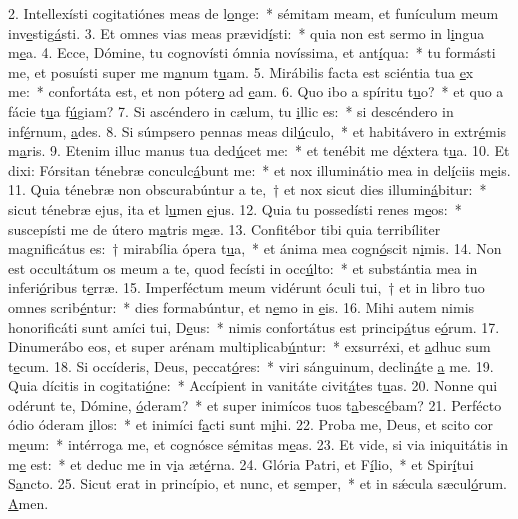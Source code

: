 2. Intellexísti cogitatiónes meas de l\uline{o}nge:~* sémitam meam, et funículum meum inv\uline{e}stig\uline{á}sti.
3. Et omnes vias meas prævid\uline{í}sti:~* quia non est sermo in l\uline{i}ngua m\uline{e}a.
4. Ecce, Dómine, tu cognovísti ómnia novíssima, et ant\uline{í}qua:~* tu formásti me, et posuísti super me m\uline{a}num t\uline{u}am.
5. Mirábilis facta est sciéntia tua \uline{e}x me:~* confortáta est, et non póter\uline{o} ad \uline{e}am.
6. Quo ibo a spíritu t\uline{u}o?~* et quo a fácie t\uline{u}a f\uline{ú}giam?
7. Si ascéndero in cælum, tu \uline{i}llic es:~* si descéndero in inf\uline{é}rnum, \uline{a}des.
8. Si súmpsero pennas meas dil\uline{ú}culo,~* et habitávero in extr\uline{é}mis m\uline{a}ris.
9. Etenim illuc manus tua ded\uline{ú}cet me:~* et tenébit me d\uline{é}xtera t\uline{u}a.
10. Et dixi: Fórsitan ténebræ conculc\uline{á}bunt me:~* et nox illuminátio mea in del\uline{í}ciis m\uline{e}is.
11. Quia ténebræ non obscurabúntur a te,~† et nox sicut dies illumin\uline{á}bitur:~* sicut ténebræ ejus, ita et l\uline{u}men \uline{e}jus.
12. Quia tu possedísti renes m\uline{e}os:~* suscepísti me de útero m\uline{a}tris m\uline{e}æ.
13. Confitébor tibi quia terribíliter magnificátus es:~† mirabília ópera t\uline{u}a,~* et ánima mea cogn\uline{ó}scit n\uline{i}mis.
14. Non est occultátum os meum a te, quod fecísti in occ\uline{ú}lto:~* et substántia mea in inferi\uline{ó}ribus t\uline{e}rræ.
15. Imperféctum meum vidérunt óculi tui,~† et in libro tuo omnes scrib\uline{é}ntur:~* dies formabúntur, et n\uline{e}mo in \uline{e}is.
16. Mihi autem nimis honorificáti sunt amíci tui, D\uline{e}us:~* nimis confortátus est princip\uline{á}tus e\uline{ó}rum.
17. Dinumerábo eos, et super arénam multiplicab\uline{ú}ntur:~* exsurréxi, et \uline{a}dhuc sum t\uline{e}cum.
18. Si occíderis, Deus, peccat\uline{ó}res:~* viri sánguinum, declin\uline{á}te \uline{a} me.
19. Quia dícitis in cogitati\uline{ó}ne:~* Accípient in vanitáte civit\uline{á}tes t\uline{u}as.
20. Nonne qui odérunt te, Dómine, \uline{ó}deram?~* et super inimícos tuos t\uline{a}besc\uline{é}bam?
21. Perfécto ódio óderam \uline{i}llos:~* et inimíci f\uline{a}cti sunt m\uline{i}hi.
22. Proba me, Deus, et scito cor m\uline{e}um:~* intérroga me, et cognósce s\uline{é}mitas m\uline{e}as.
23. Et vide, si via iniquitátis in m\uline{e} est:~* et deduc me in v\uline{i}a æt\uline{é}rna.
24. Glória Patri, et F\uline{í}lio,~* et Spir\uline{í}tui S\uline{a}ncto.
25. Sicut erat in princípio, et nunc, et s\uline{e}mper,~* et in sǽcula sæcul\uline{ó}rum. \uline{A}men.
